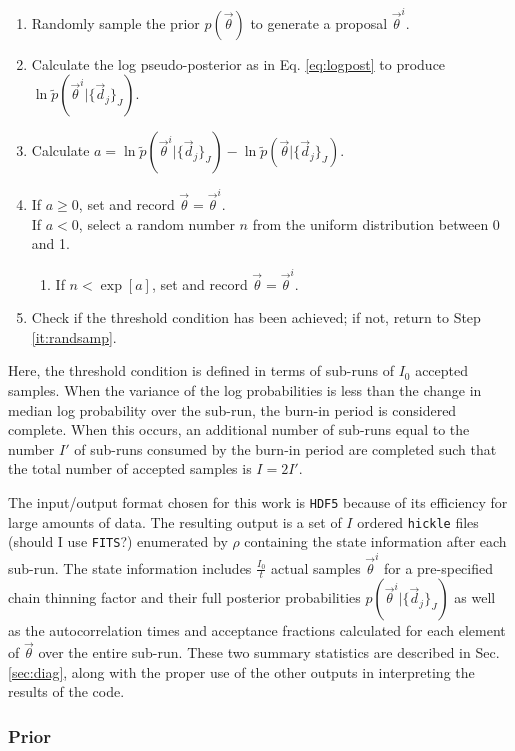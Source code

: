 \documentclass[preprint]{aastex}
\begin{document}
\begin{enumerate}
\item \label{it:randsamp} Randomly sample the prior $p(\vec{\theta})$ to 
generate a proposal $\vec{\theta}^{i}$.
\item Calculate the log pseudo-posterior as in Eq. \ref{eq:logpost} to produce 
$\ln\tilde{p}(\vec{\theta}^{i}|\{\vec{d}_{j}\}_{J})$.
\item Calculate 
$a=\ln\tilde{p}(\vec{\theta}^{i}|\{\vec{d}_{j}\}_{J})-\ln\tilde{p}(\vec{\theta}|
\{\vec{d}_{j}\}_{J})$.
\item If $a\geq0$, set and record $\vec{\theta}=\vec{\theta}^{i}$.\\
If $a<0$, select a random number $n$ from the uniform distribution between 0 
and 1.
\begin{enumerate}
\item If $n<\exp[a]$, set and record $\vec{\theta}=\vec{\theta}^{i}$.
\end{enumerate}
\item Check if the threshold condition has been achieved; if not, return to 
Step \ref{it:randsamp}.
\end{enumerate}

Here, the threshold condition is defined in terms of sub-runs of $I_{0}$ 
accepted samples.  When the variance of the log probabilities is less than the 
change in median log probability over the sub-run, the burn-in period is 
considered complete.  When this occurs, an additional number of sub-runs equal 
to the number $I'$ of sub-runs consumed by the burn-in period are completed 
such that the total number of accepted samples is $I=2I'$.  

The input/output format chosen for this work is \texttt{HDF5} because of its 
efficiency for large amounts of data.  The resulting output is a set of $I$ 
ordered \texttt{hickle} files (should I use \texttt{FITS}?) enumerated by 
$\rho$ containing the state information after each sub-run.  The state 
information includes $\frac{I_{0}}{t}$ actual samples $\vec{\theta}^{i}$ for a 
pre-specified chain thinning factor and their full posterior probabilities 
$p(\vec{\theta}^{i}|\{\vec{d}_{j}\}_{J})$ as well as the autocorrelation times 
and acceptance fractions calculated for each element of $\vec{\theta}$ over the 
entire sub-run.  These two summary statistics are described in Sec. 
\ref{sec:diag}, along with the proper use of the other outputs in interpreting 
the results of the code.

\clearpage
\subsubsection{Prior}
\label{sec:prior}
\end{document}
